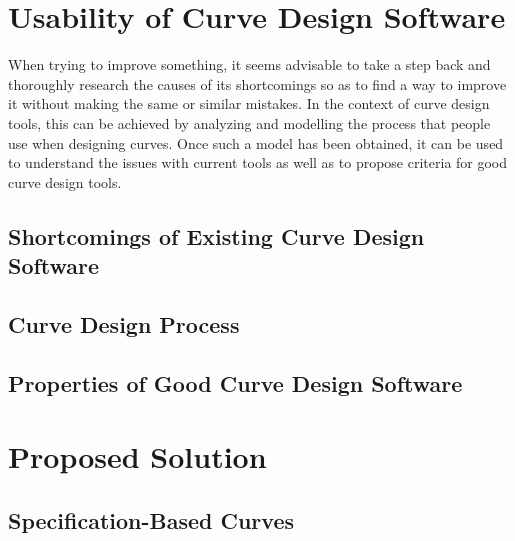 \documentclass[a4paper]{article}
\begin{document}
	\section{Usability of Curve Design Software}

		When trying to improve something, it seems advisable to take a step back and thoroughly research the causes of its shortcomings so as to find a way to improve it without making the same or similar mistakes. In the context of curve design tools, this can be achieved by analyzing and modelling the process that people use when designing curves. Once such a model has been obtained, it can be used to understand the issues with current tools as well as to propose criteria for good curve design tools.

		\subsection{Shortcomings of Existing Curve Design Software}


		\subsection{Curve Design Process}

		\subsection{Properties of Good Curve Design Software}


	\section{Proposed Solution}

		\subsection{Specification-Based Curves}
\end{document}
